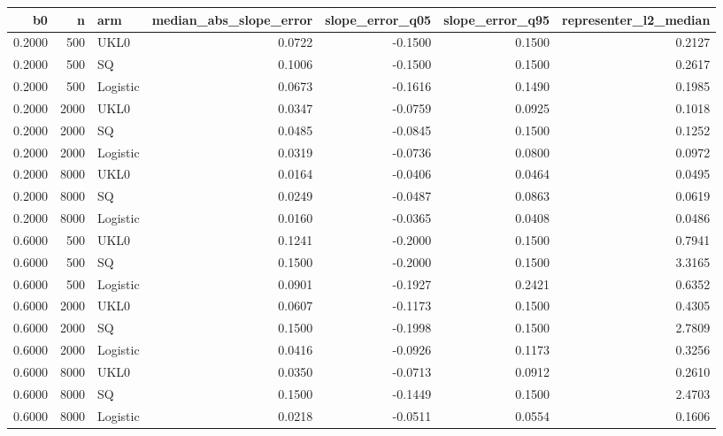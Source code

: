 \begin{tabular}{rrlrrrr}
\toprule
b0 & n & arm & median\_abs\_slope\_error & slope\_error\_q05 & slope\_error\_q95 & representer\_l2\_median \\
\midrule
0.2000 & 500 & UKL0 & 0.0722 & -0.1500 & 0.1500 & 0.2127 \\
0.2000 & 500 & SQ & 0.1006 & -0.1500 & 0.1500 & 0.2617 \\
0.2000 & 500 & Logistic & 0.0673 & -0.1616 & 0.1490 & 0.1985 \\
0.2000 & 2000 & UKL0 & 0.0347 & -0.0759 & 0.0925 & 0.1018 \\
0.2000 & 2000 & SQ & 0.0485 & -0.0845 & 0.1500 & 0.1252 \\
0.2000 & 2000 & Logistic & 0.0319 & -0.0736 & 0.0800 & 0.0972 \\
0.2000 & 8000 & UKL0 & 0.0164 & -0.0406 & 0.0464 & 0.0495 \\
0.2000 & 8000 & SQ & 0.0249 & -0.0487 & 0.0863 & 0.0619 \\
0.2000 & 8000 & Logistic & 0.0160 & -0.0365 & 0.0408 & 0.0486 \\
0.6000 & 500 & UKL0 & 0.1241 & -0.2000 & 0.1500 & 0.7941 \\
0.6000 & 500 & SQ & 0.1500 & -0.2000 & 0.1500 & 3.3165 \\
0.6000 & 500 & Logistic & 0.0901 & -0.1927 & 0.2421 & 0.6352 \\
0.6000 & 2000 & UKL0 & 0.0607 & -0.1173 & 0.1500 & 0.4305 \\
0.6000 & 2000 & SQ & 0.1500 & -0.1998 & 0.1500 & 2.7809 \\
0.6000 & 2000 & Logistic & 0.0416 & -0.0926 & 0.1173 & 0.3256 \\
0.6000 & 8000 & UKL0 & 0.0350 & -0.0713 & 0.0912 & 0.2610 \\
0.6000 & 8000 & SQ & 0.1500 & -0.1449 & 0.1500 & 2.4703 \\
0.6000 & 8000 & Logistic & 0.0218 & -0.0511 & 0.0554 & 0.1606 \\
\bottomrule
\end{tabular}
